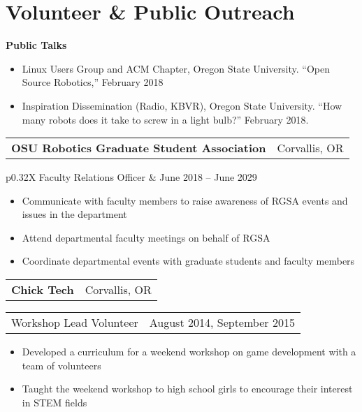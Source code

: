 \documentclass[letterpaper,10pt,titlepage]{article}
\newcommand{\leftW}{0.32\textwidth}
\begin{document}
\section*{Volunteer \& Public Outreach}
\textbf{Public Talks}
\begin{itemize}
	\item Linux Users Group and ACM Chapter, Oregon State University. ``Open Source Robotics,'' February 2018
	\item Inspiration Dissemination (Radio, KBVR), Oregon State University. ``How many robots does it take to screw in a light bulb?'' February 2018. 
\end{itemize}
\begin{tabularx}{\linewidth}{Xr}
	\textbf{OSU Robotics Graduate Student Association} & Corvallis, OR\\
\end{tabularx}
\begin{tabularx}{\linewidth}{p{\leftW}X}
	Faculty Relations Officer          & June 2018 -- June 2029\\
\end{tabularx}
\begin{itemize} \itemsep1pt \parskip0pt 
	\item Communicate with faculty members to raise awareness of RGSA events and issues in the department
	\item Attend departmental faculty meetings on behalf of RGSA
	\item Coordinate departmental events with graduate students and faculty members
\end{itemize}
\begin{tabularx}{\linewidth}{Xr}
	\textbf{Chick Tech} & Corvallis, OR\\
\end{tabularx}
\begin{tabularx}{\linewidth}{p{\leftW}X}
	Workshop Lead Volunteer          &  August 2014, September 2015\\
\end{tabularx}
\begin{itemize} \itemsep1pt \parskip0pt 
	\item Developed a curriculum for a weekend workshop on game development with a team of volunteers
	\item Taught the weekend workshop to high school girls to encourage their interest in STEM fields
\end{itemize}
\end{document}
